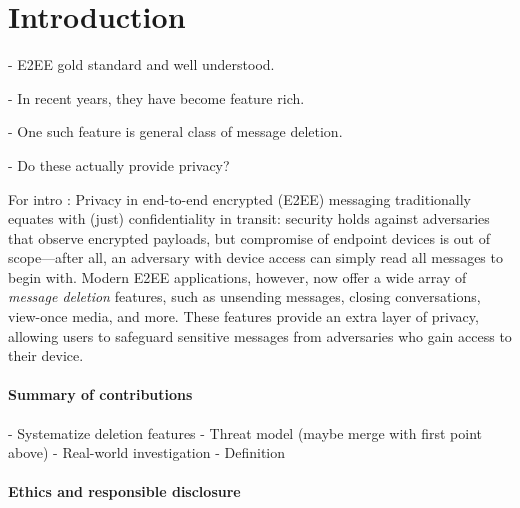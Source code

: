 \section{Introduction}

- E2EE gold standard and well understood.

- In recent years, they have become feature rich.

- One such feature is general class of message deletion.

- Do these actually provide privacy?


For intro : Privacy in end-to-end encrypted (E2EE) messaging traditionally equates with (just) confidentiality in transit: security holds against adversaries that observe encrypted payloads, but compromise of endpoint devices is out of scope---after all, an adversary with device access can simply read all messages to begin with. Modern E2EE applications, however, now offer a wide array of \emph{message deletion} features, such as unsending messages, closing conversations, view-once media, and more. These features provide an extra layer of privacy, allowing users to safeguard sensitive messages from adversaries who gain access to their device.



\paragraph{Summary of contributions}

- Systematize deletion features
- Threat model (maybe merge with first point above)
- Real-world investigation
- Definition

\paragraph{Ethics and responsible disclosure}

